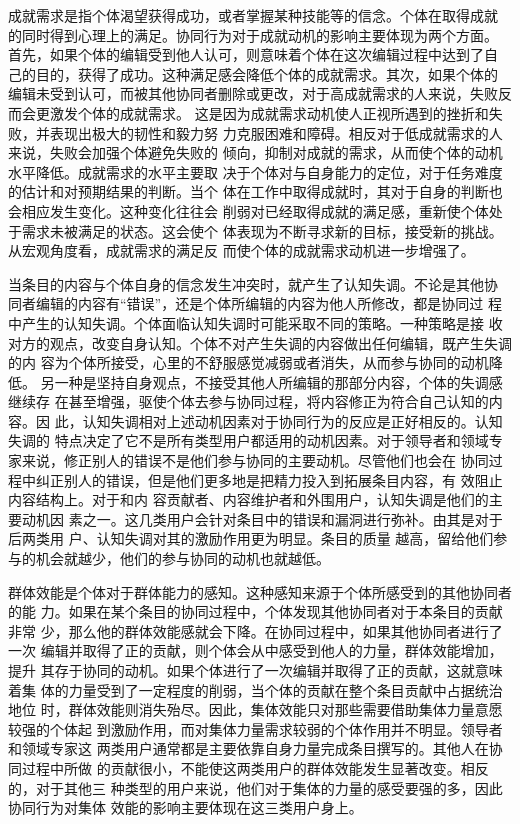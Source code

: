 成就需求是指个体渴望获得成功，或者掌握某种技能等的信念。个体在取得成就
的同时得到心理上的满足。协同行为对于成就动机的影响主要体现为两个方面。
首先，如果个体的编辑受到他人认可，则意味着个体在这次编辑过程中达到了自
己的目的，获得了成功。这种满足感会降低个体的成就需求。其次，如果个体的
编辑未受到认可，而被其他协同者删除或更改，对于高成就需求的人来说，失败反而会更激发个体的成就需求。
这是因为成就需求动机使人正视所遇到的挫折和失败，并表现出极大的韧性和毅力努
力克服困难和障碍。相反对于低成就需求的人来说，失败会加强个体避免失败的
倾向，抑制对成就的需求，从而使个体的动机水平降低。成就需求的水平主要取
决于个体对与自身能力的定位，对于任务难度的估计和对预期结果的判断。当个
体在工作中取得成就时，其对于自身的判断也会相应发生变化。这种变化往往会
削弱对已经取得成就的满足感，重新使个体处于需求未被满足的状态。这会使个
体表现为不断寻求新的目标，接受新的挑战。从宏观角度看，成就需求的满足反
而使个体的成就需求动机进一步增强了。

当条目的内容与个体自身的信念发生冲突时，就产生了认知失调。不论是其他协
同者编辑的内容有“错误”，还是个体所编辑的内容为他人所修改，都是协同过
程中产生的认知失调。个体面临认知失调时可能采取不同的策略。一种策略是接
收对方的观点，改变自身认知。个体不对产生失调的内容做出任何编辑，既产生失调的内
容为个体所接受，心里的不舒服感觉减弱或者消失，从而参与协同的动机降低。
另一种是坚持自身观点，不接受其他人所编辑的那部分内容，个体的失调感继续存
在甚至增强，驱使个体去参与协同过程，将内容修正为符合自己认知的内容。因
此，认知失调相对上述动机因素对于协同行为的反应是正好相反的。认知失调的
特点决定了它不是所有类型用户都适用的动机因素。对于领导者和领域专家来说，修正别人的错误不是他们参与协同的主要动机。尽管他们也会在
协同过程中纠正别人的错误，但是他们更多地是把精力投入到拓展条目内容，有
效阻止内容结构上。对于和内
容贡献者、内容维护者和外围用户，认知失调是他们的主要动机因
素之一。这几类用户会针对条目中的错误和漏洞进行弥补。由其是对于后两类用
户、认知失调对其的激励作用更为明显。条目的质量
越高，留给他们参与的机会就越少，他们的参与协同的动机也就越低。

群体效能是个体对于群体能力的感知。这种感知来源于个体所感受到的其他协同者的能
力。如果在某个条目的协同过程中，个体发现其他协同者对于本条目的贡献非常
少，那么他的群体效能感就会下降。在协同过程中，如果其他协同者进行了一次
编辑并取得了正的贡献，则个体会从中感受到他人的力量，群体效能增加，提升
其存于协同的动机。如果个体进行了一次编辑并取得了正的贡献，这就意味着集
体的力量受到了一定程度的削弱，当个体的贡献在整个条目贡献中占据统治地位
时，群体效能则消失殆尽。因此，集体效能只对那些需要借助集体力量意愿较强的个体起
到激励作用，而对集体力量需求较弱的个体作用并不明显。领导者和领域专家这
两类用户通常都是主要依靠自身力量完成条目撰写的。其他人在协同过程中所做
的贡献很小，不能使这两类用户的群体效能发生显著改变。相反的，对于其他三
种类型的用户来说，他们对于集体的力量的感受要强的多，因此协同行为对集体
效能的影响主要体现在这三类用户身上。

